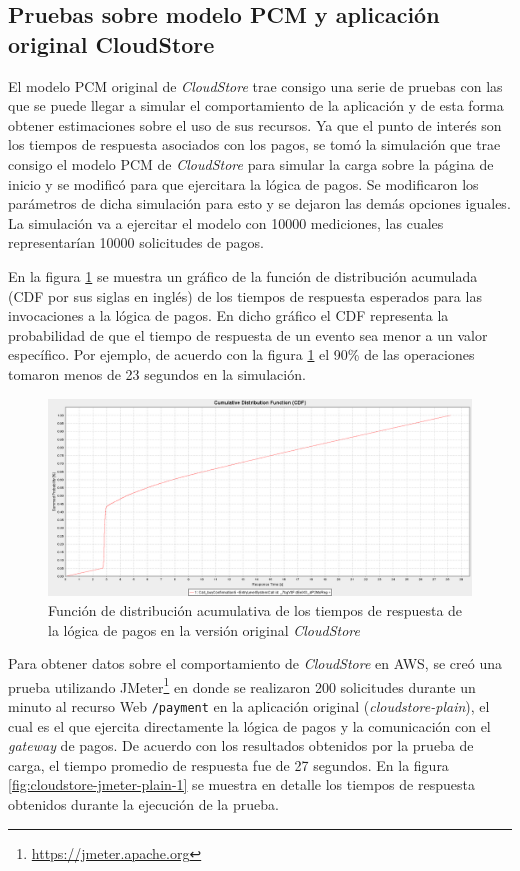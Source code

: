 \documentclass[conference]{IEEEtran}
\begin{document}
\subsection{Pruebas sobre modelo PCM y aplicación original CloudStore} \label{sec:pruebas-1}
El modelo PCM original de \emph{CloudStore} trae consigo una serie de pruebas con las que se puede llegar a simular el comportamiento de la aplicación y de esta forma obtener estimaciones sobre el uso de sus recursos. Ya que el punto de interés son los tiempos de respuesta asociados con los pagos, se tomó la simulación que trae consigo el modelo PCM de \emph{CloudStore} para simular la carga sobre la página de inicio y se modificó para que ejercitara la lógica de pagos. Se modificaron los parámetros de dicha simulación para esto y se dejaron las demás opciones iguales. La simulación va a ejercitar el modelo con 10000 mediciones, las cuales representarían 10000 solicitudes de pagos.

En la figura \ref{fig:cloudstore-pcm-1} se muestra un gráfico de la función de distribución acumulada (CDF por sus siglas en inglés) de los tiempos de respuesta esperados para las invocaciones a la lógica de pagos. En dicho gráfico el CDF representa la probabilidad de que el tiempo de respuesta de un evento sea menor a un valor específico. Por ejemplo, de acuerdo con la figura \ref{fig:cloudstore-pcm-1} el 90\% de las operaciones tomaron menos de 23 segundos en la simulación.

\begin{figure}[h]
  \centering
  \includegraphics[width=17cm]{cloudstore-plain-cdf-1}
  \caption{\small{Función de distribución acumulativa de los tiempos de respuesta de la lógica de pagos en la versión original \emph{CloudStore}}}
  \label{fig:cloudstore-pcm-1}
\end{figure}

Para obtener datos sobre el comportamiento de \emph{CloudStore} en AWS, se creó una prueba utilizando JMeter\footnote{\url{https://jmeter.apache.org}} en donde se realizaron 200 solicitudes durante un minuto al recurso Web \texttt{/payment} en la aplicación original (\emph{cloudstore-plain}), el cual es el que ejercita directamente la lógica de pagos y la comunicación con el \emph{gateway} de pagos. De acuerdo con los resultados obtenidos por la prueba de carga, el tiempo promedio de respuesta fue de 27 segundos. En la figura  \ref{fig:cloudstore-jmeter-plain-1} se muestra en detalle los tiempos de respuesta obtenidos durante la ejecución de la prueba.
\end{document}
